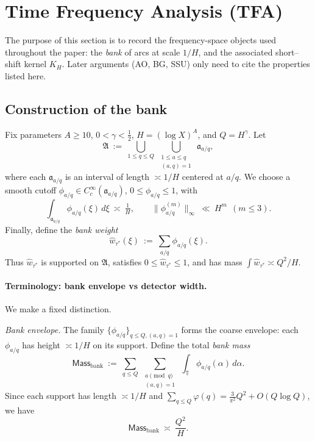 \section{Time Frequency Analysis (TFA)}\label{sec:TFA}

The purpose of this section is to record the frequency-space
objects used throughout the paper: the \emph{bank} of arcs at scale $1/H$,
and the associated short--shift kernel $K_H$.  Later arguments (AO, BG, SSU)
only need to cite the properties listed here.

\subsection{Construction of the bank}

Fix parameters $A\ge 10$, $0<\gamma<\tfrac12$, $H=(\log X)^A$, and
$Q=H^\gamma$.  
Let
\[
\mathfrak A\ :=\ \bigcup_{1\le q\le Q}\ \bigcup_{\substack{1\le a\le q\\(a,q)=1}}
\ \mathfrak a_{a/q},
\]
where each $\mathfrak a_{a/q}$ is an interval of length $\asymp 1/H$
centered at $a/q$.  
We choose a smooth cutoff 
$\phi_{a/q}\in C_c^\infty(\mathfrak a_{a/q})$, $0\le \phi_{a/q}\le 1$, with
\[
\int_{\mathfrak a_{a/q}} \phi_{a/q}(\xi)\,d\xi\ \asymp\ \tfrac{1}{H}, 
\qquad 
\|\phi_{a/q}^{(m)}\|_\infty \ \ll\ H^m\ \ (m\le 3).
\]
Finally, define the \emph{bank weight}
\[
\widehat w_{\tau^\ast}(\xi)\ :=\ \sum_{a/q}\phi_{a/q}(\xi).
\]
Thus $\widehat w_{\tau^\ast}$ is supported on $\mathfrak A$, satisfies
$0\le \widehat w_{\tau^\ast}\le 1$, and has mass $\int \widehat w_{\tau^\ast}\asymp Q^2/H$.

\paragraph{Terminology: bank envelope vs detector width.}
We make a fixed distinction.

\emph{Bank envelope.} The family $\{\phi_{a/q}\}_{q\le Q,(a,q)=1}$ forms the coarse envelope: each $\phi_{a/q}$ has height $\asymp 1/H$ on its support. Define the total \emph{bank mass}
\[
\mathsf{Mass}_{\mathrm{bank}}
\ :=\ 
\sum_{q\le Q}\ \sum_{\substack{a\!\!\!\pmod q\\(a,q)=1}}\ \int_{\mathbb T}\phi_{a/q}(\alpha)\,d\alpha.
\]
Since each support has length $\asymp 1/H$ and $\sum_{q\le Q}\varphi(q)=\tfrac{3}{\pi^2}Q^2+O(Q\log Q)$, we have
\begin{equation}\label{eq:bank-mass}
\mathsf{Mass}_{\mathrm{bank}}\ \asymp\ \frac{Q^2}{H}.
\end{equation}

